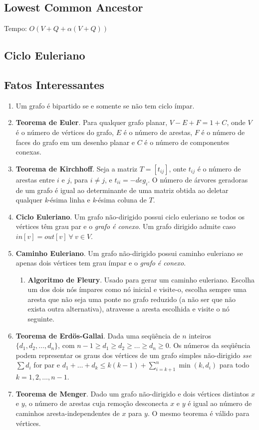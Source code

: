 \documentclass[12pt,a4paper]{article}
\begin{document}
		\subsection{Lowest Common Ancestor}
			Tempo: \( O(V + Q + \alpha(V + Q)) \)
			
		\subsection{Ciclo Euleriano}
			
		\subsection{Fatos Interessantes}
			\begin{enumerate}
				\item Um grafo é bipartido se e somente se não tem ciclo ímpar.
				\item \textbf{Teorema de Euler}. Para qualquer grafo planar, \( V - E + F = 1 + C \), onde \(V\) é o número de vértices do grafo, \(E\) é o número de arestas, \(F\) é o número de faces do grafo em um desenho planar e \(C\) é o número de componentes conexas.
				\item \textbf{Teorema de Kirchhoff}. Seja a matriz \( T = [ t_{ij} ] \), onte \( t_{ij} \) é o número de arestas entre \(i\) e \(j\), para \( i \neq j \), e \( t_{ii} = - deg_i \). O número de árvores geradoras de um grafo é igual ao determinante de uma matriz obtida ao deletar qualquer \emph{k}-ésima linha e \emph{k}-ésima coluna de \(T\).
				\item \textbf{Ciclo Euleriano}. Um grafo não-dirigido possui ciclo euleriano se todos os vértices têm grau par e o \emph{grafo é conexo}. Um grafo dirigido admite caso $in[v] = out[v] ~ \forall ~ v \in V$.
				\item \textbf{Caminho Euleriano}. Um grafo não-dirigido possui caminho euleriano se apenas dois vértices tem grau ímpar e o \emph{grafo é conexo}.
				\begin{enumerate}
					\item \textbf{Algoritmo de Fleury}. Usado para gerar um caminho euleriano. Escolha um dos dois nós ímpares como nó inicial e visite-o, escolha sempre uma aresta que não seja uma ponte no grafo reduzido (a não ser que não exista outra alternativa), atravesse a aresta escolhida e visite o nó seguinte.
				\end{enumerate}
				\item \textbf{Teorema de Erdös-Gallai}. Dada uma seqüência de $n$ inteiros $\{d_1, d_2, \ldots, d_n\}$, com $n-1 \geq d_1 \geq d_2 \geq \ldots \geq d_n \geq 0$. Os números da seqüência podem representar os graus dos vértices de um grafo simples não-dirigido \emph{sse} $\sum d_i$ for par e $d_1 + \ldots + d_k \leq k (k - 1) + \sum_{i=k+1}^n \min(k, d_i)$ para todo $k = 1, 2, \ldots, n - 1$.
				\item \textbf{Teorema de Menger}. Dado um grafo não-dirigido e dois vértices distintos $x$ e $y$, o número de arestas cuja remoção desconecta $x$ e $y$ é igual ao número de caminhos aresta-independentes de $x$ para $y$. O mesmo teorema é válido para vértices.
			\end{enumerate}
\end{document}
